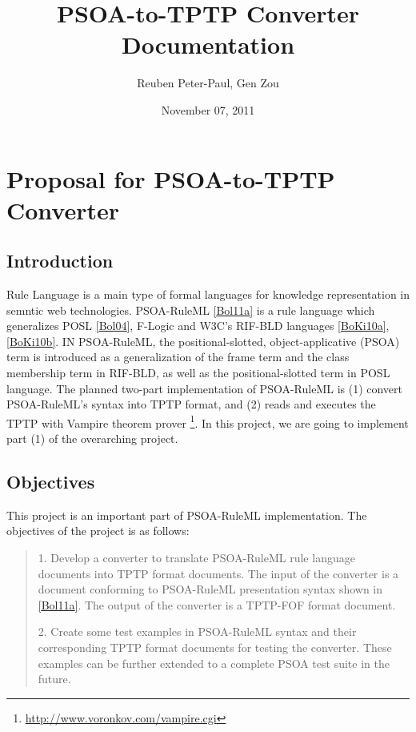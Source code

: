 \documentclass[letterpaper,10pt,english]{sphinxmanual}
\title{PSOA-to-TPTP Converter Documentation}
\date{November 07, 2011}
\author{Reuben Peter-Paul, Gen Zou}
\begin{document}
\maketitle
\tableofcontents
{}\label{main::doc}



\chapter{Proposal for PSOA-to-TPTP Converter}
\label{project-proposal/index::doc}\label{project-proposal/index:welcome-to-psoa-to-tptp-converter-s-documentation}\label{project-proposal/index:proposal-for-psoa-to-tptp-converter}

\section{Introduction}
\label{project-proposal/index:introduction}
Rule Language is a main type of formal languages for knowledge representation in
semntic web technologies.  PSOA-RuleML {\hyperref[project-proposal/index:bol11a]{{[}Bol11a{]}}} is a rule language which
generalizes POSL {\hyperref[project-proposal/index:bol04]{{[}Bol04{]}}}, F-Logic and W3C's RIF-BLD languages
{\hyperref[project-proposal/index:boki10a]{{[}BoKi10a{]}}}, {\hyperref[project-proposal/index:boki10b]{{[}BoKi10b{]}}}.  IN PSOA-RuleML, the positional-slotted,
object-applicative (PSOA) term is introduced as a generalization of the frame
term and the class membership term in RIF-BLD, as well as the positional-slotted
term in POSL language.  The planned two-part implementation of PSOA-RuleML is
(1) convert PSOA-RuleML's syntax into TPTP format, and (2) reads and executes
the TPTP with Vampire theorem prover \footnote{
\href{http://www.voronkov.com/vampire.cgi}{http://www.voronkov.com/vampire.cgi}
}.  In this project, we are going to
implement part (1) of the overarching project.


\section{Objectives}
\label{project-proposal/index:objectives}
This project is an important part of PSOA-RuleML implementation.  The objectives
of the project is as follows:
\begin{quote}

1. Develop a converter to translate PSOA-RuleML rule language documents into TPTP
format documents.  The input of the converter is a document conforming to
PSOA-RuleML presentation syntax shown in {\hyperref[project-proposal/index:bol11a]{{[}Bol11a{]}}}.  The output of the
converter is a TPTP-FOF format document.

2. Create some test examples in PSOA-RuleML syntax and their corresponding TPTP
format documents for testing the converter.  These examples can be further
extended to a complete PSOA test suite in the future.
\end{quote}
\end{document}
